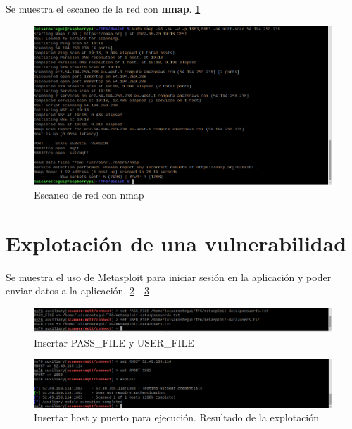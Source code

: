 {Se muestra el escaneo de la red con \textbf{nmap}. \ref{fig:figure19-prueba}

\begin{figure}[p]
    \centering
    \includegraphics[width=\linewidth]{imagenes/2022-06-20-191838_1920x1080_scrot.png}
    \caption{Escaneo de red con nmap}
    \label{fig:figure19-prueba}
\end{figure}


\section{Explotación de una vulnerabilidad}

Se muestra el uso de Metasploit para iniciar sesión en la aplicación y poder enviar datos a la aplicación. \ref{fig:figure22-prueba} - \ref{fig:figure22.2-prueba} \\

\begin{figure}[p]
    \centering
    \includegraphics[width=\linewidth]{imagenes/2022-06-14-180947_1920x1080_scrot.png}
    \caption{Insertar PASS\_FILE y USER\_FILE}
    \label{fig:figure22-prueba}
\end{figure}

\begin{figure}[p]
    \centering
    \includegraphics[width=\linewidth]{imagenes/2022-06-14-183011_1920x1080_scrot.png}
    \caption{Insertar host y puerto para ejecución. Resultado de la explotación}
    \label{fig:figure22.2-prueba}
\end{figure}

}

